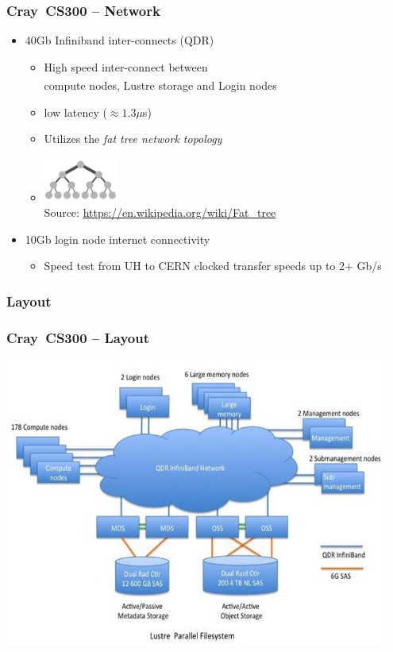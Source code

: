 \documentclass[t,hyperref={pdfpagelabels=false}]{beamer}
\newcommand{\regtrademark}{\fontsize{5}{6}\selectfont \textsuperscript{\textregistered}}
\newcommand{\lustre}{Lustre{\regtrademark}}
\newcommand{\craycs}{Cray~CS300}
\begin{document}
\begin{frame}
	\frametitle{{\craycs} -- Network}
	\begin{itemize}
		\item 40Gb Infiniband inter-connects (QDR)
		\begin{itemize}
			\item High speed inter-connect between~\\compute nodes, {\lustre} storage and Login nodes
                        \item low latency ($\approx1.3\mu$s)
			\item Utilizes the \emph{fat tree network topology}
			\item[] \includegraphics[width=0.20\textwidth]{images/Fat_tree_network} \\[-1ex] {\fontsize{3}{4} \selectfont Source: \url{https://en.wikipedia.org/wiki/Fat_tree} } 		
		\end{itemize}
		\item 10Gb login node internet connectivity
		\begin{itemize}
			\item Speed test from UH to CERN clocked transfer speeds up to 2$+$ Gb/s
		\end{itemize}	
	\end{itemize}
\end{frame}

\subsubsection{Layout}
\begin{frame}
	\frametitle{{\craycs} -- Layout}
	\includegraphics[width=0.95\textwidth]{images/high_level}
\end{frame}
\end{document}
